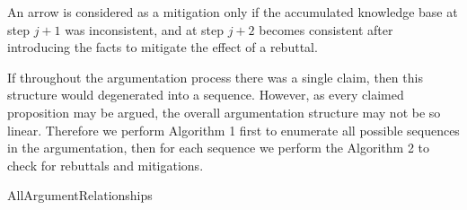 \documentclass[acmtocl]{acmtrans2m}
\begin{document}
An arrow is considered as a mitigation only if the accumulated knowledge base at step $j+1$ was inconsistent,  and at step $j+2$ becomes consistent after introducing the facts to mitigate the effect of a rebuttal. 

If throughout the argumentation process there was a single claim,  then this structure would degenerated into a sequence. 
However,  as every claimed proposition may be argued,  the overall argumentation structure may not be so linear. Therefore we perform  Algorithm 1 first to enumerate all possible sequences in the argumentation, then for each sequence we perform the Algorithm 2 to check for rebuttals and mitigations.

   \begin{algorithm}[h]\label{algo:1}
   \footnotesize
   \caption{AllArgumentRelationships} \linesnumbered
   \SetLine 
   \end{algorithm}
\end{document}
